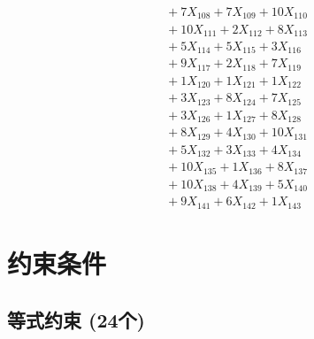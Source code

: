 \documentclass[a4paper,10pt]{article}
\begin{document}
{\begin{align}
&\;  + 7 X_{108} + 7 X_{109} + 10 X_{110} \\[0.3ex]
&\;  + 10 X_{111} + 2 X_{112} + 8 X_{113} \\[0.3ex]
&\;  + 5 X_{114} + 5 X_{115} + 3 X_{116} \\[0.3ex]
&\;  + 9 X_{117} + 2 X_{118} + 7 X_{119} \\[0.3ex]
&\;  + 1 X_{120} + 1 X_{121} + 1 X_{122} \\[0.3ex]
&\;  + 3 X_{123} + 8 X_{124} + 7 X_{125} \\[0.5ex]\allowbreak
&\;  + 3 X_{126} + 1 X_{127} + 8 X_{128} \\[0.3ex]
&\;  + 8 X_{129} + 4 X_{130} + 10 X_{131} \\[0.3ex]
&\;  + 5 X_{132} + 3 X_{133} + 4 X_{134} \\[0.3ex]
&\;  + 10 X_{135} + 1 X_{136} + 8 X_{137} \\[0.3ex]
&\;  + 10 X_{138} + 4 X_{139} + 5 X_{140} \\[0.3ex]
&\;  + 9 X_{141} + 6 X_{142} + 1 X_{143}\nonumber
\end{align}
}

\section{约束条件}

\subsection{等式约束 (24个)}
\end{document}
